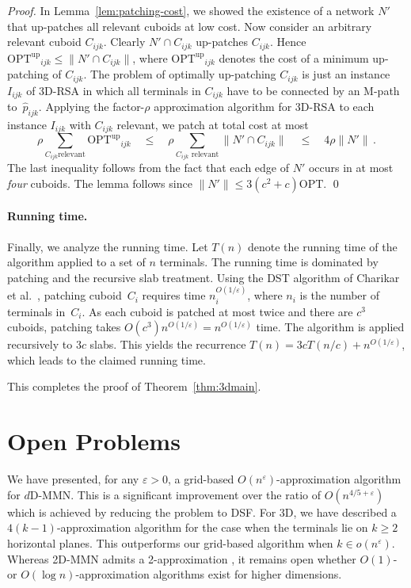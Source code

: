 \documentclass[11pt]{llncs}
\newcommand{\eps}{\ensuremath{\varepsilon}\xspace}
\newcommand{\opt}{\ensuremath{\mathrm{OPT}}\xspace}
\newcommand{\optup}{\ensuremath{\opt^\mathrm{up}}\xspace}
\newcommand{\etal}{et al.}
\newenvironment{pf}{\begin{proof}}{\qed\end{proof}}
\begin{document}
\begin{pf}
  In Lemma~\ref{lem:patching-cost}, we showed the existence of a
  network $N'$ that up-patches all relevant cuboids at low cost.  Now
  consider an arbitrary relevant cuboid $C_{ijk}$.  Clearly $N'\cap
  C_{ijk}$ up-patches $C_{ijk}$.  Hence $\optup_{ijk} \le \|N'\cap
  C_{ijk}\|$, where $\optup_{ijk}$ denotes the cost of a minimum
  up-patching of $C_{ijk}$.  The problem of optimally up-patching
  $C_{ijk}$ is just an instance $I_{ijk}$ of 3D-RSA in which all
  terminals in $C_{ijk}$ have to be connected by an M-path
  to~$\hat{p}_{ijk}$.  Applying the factor-$\rho$ approximation algorithm for
  3D-RSA to each instance $I_{ijk}$ with $C_{ijk}$ relevant, we patch
  at total cost at most
  \begin{displaymath}
    \rho\sum_{C_{ijk}\text{
	relevant}}\optup_{ijk} \quad\le\quad
    \rho\sum_{C_{ijk}\text{ relevant}}\|N'\cap
    C_{ijk}\| \quad\le\quad 4\rho \|N'\|\,. 
  \end{displaymath}
  The last inequality follows from the fact that each edge of $N'$
  occurs in at most \emph{four} cuboids.  The lemma follows since
  $\|N'\|\leq 3(c^2+c)\opt$.
\end{pf}

\paragraph{Running time.}

Finally, we analyze the running time.  Let $T(n)$ denote the running
time of the algorithm applied to a set of $n$ 
terminals. The running time is dominated by patching and the recursive
slab treatment.  Using the DST algorithm of Charikar
\etal~\cite{cccdggl-aadsp-98}, patching cuboid~$C_i$ requires time  
$n_i^{O(1/\eps)}$, where $n_i$ is the number of terminals in~$C_i$.  As
each cuboid is patched at most twice and there are $c^3$ cuboids,
patching takes $O(c^3) n^{O(1/\eps)} =
n^{O(1/\eps)}$ time.  The algorithm is applied recursively to $3c$
slabs.  This yields the recurrence $T(n) = 3c T(n/c) + n^{O(1/\eps)}$,
which leads to the claimed running time.

This completes the proof of Theorem~\ref{thm:3dmain}.

\section{Open Problems}

We have presented, for any $\eps>0$, a grid-based
$O(n^\eps)$-approximation algorithm 
for $d$D-MMN.  This is a significant improvement over the ratio of
$O(n^{4/5+\eps})$ which is achieved by reducing the problem to
DSF. For 3D, we have described a $4(k-1)$-approximation algorithm for the case when
the terminals lie on $k \ge 2$ horizontal planes. This outperforms our
grid-based algorithm when $k \in o(n^\eps)$. 
Whereas 2D-MMN admits a 2-approximation
\cite{cnv-raamm-08,gsz-yaa2a-08,n-eprmc-05}, it remains open whether
$O(1)$- or $O(\log n)$-appro\-xi\-ma\-tion algorithms exist for higher
dimensions.
\end{document}
